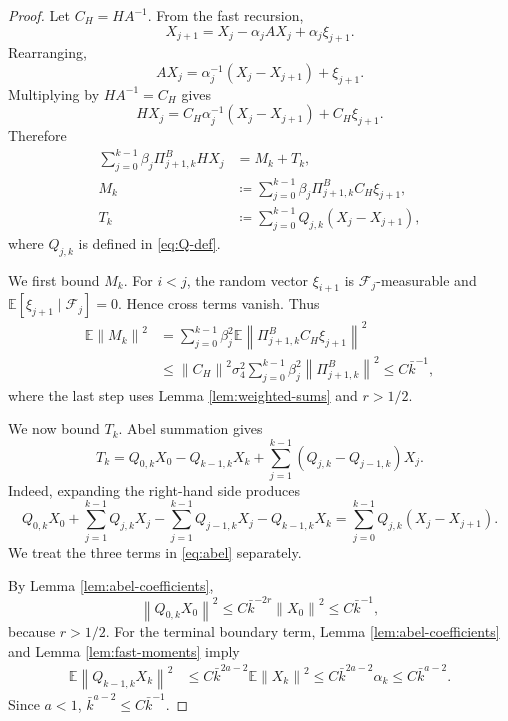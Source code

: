\documentclass{article}
\newcommand{\E}{\mathbb{E}}
\newcommand{\norm}[1]{\left\lVert #1\right\rVert}
\begin{document}
\begin{proof}
Let $C_H=HA^{-1}$. From the fast recursion,
\[
  X_{j+1}=X_j-\alpha_jAX_j+\alpha_j\xi_{j+1}.
\]
Rearranging,
\begin{equation}
  AX_j=\alpha_j^{-1}(X_j-X_{j+1})+\xi_{j+1}. \label{eq:poisson-identity}
\end{equation}
Multiplying by $HA^{-1}=C_H$ gives
\begin{equation}
  HX_j=C_H\alpha_j^{-1}(X_j-X_{j+1})+C_H\xi_{j+1}. \label{eq:H-identity}
\end{equation}
Therefore
\begin{align}
  \sum_{j=0}^{k-1}\beta_j\Pi^B_{j+1,k}HX_j
  &=M_k+T_k, \label{eq:S-M-T}\\
  M_k&\coloneqq\sum_{j=0}^{k-1}\beta_j\Pi^B_{j+1,k}C_H\xi_{j+1}, \label{eq:M-def}\\
  T_k&\coloneqq\sum_{j=0}^{k-1}Q_{j,k}(X_j-X_{j+1}), \label{eq:T-def}
\end{align}
where $Q_{j,k}$ is defined in \eqref{eq:Q-def}.

We first bound $M_k$. For $i<j$, the random vector $\xi_{i+1}$ is $\mathcal F_j$-measurable and $\E[\xi_{j+1}\mid\mathcal F_j]=0$. Hence cross terms vanish. Thus
\[
\begin{aligned}
  \E\norm{M_k}^2
  &=\sum_{j=0}^{k-1}\beta_j^2\E\norm{\Pi^B_{j+1,k}C_H\xi_{j+1}}^2\\
  &\le \norm{C_H}^2\sigma_4^2\sum_{j=0}^{k-1}\beta_j^2\norm{\Pi^B_{j+1,k}}^2
  \le C\bar k^{-1},
\end{aligned}
\]
where the last step uses Lemma \ref{lem:weighted-sums} and $r>1/2$.

We now bound $T_k$. Abel summation gives
\begin{equation}
  T_k=Q_{0,k}X_0-Q_{k-1,k}X_k+
      \sum_{j=1}^{k-1}(Q_{j,k}-Q_{j-1,k})X_j. \label{eq:abel}
\end{equation}
Indeed, expanding the right-hand side produces
\[
  Q_{0,k}X_0+
  \sum_{j=1}^{k-1}Q_{j,k}X_j-
  \sum_{j=1}^{k-1}Q_{j-1,k}X_j-Q_{k-1,k}X_k
  =\sum_{j=0}^{k-1}Q_{j,k}(X_j-X_{j+1}).
\]
We treat the three terms in \eqref{eq:abel} separately.

By Lemma \ref{lem:abel-coefficients},
\[
  \norm{Q_{0,k}X_0}^2\le C\bar k^{-2r}\norm{X_0}^2\le C\bar k^{-1},
\]
because $r>1/2$. For the terminal boundary term, Lemma \ref{lem:abel-coefficients} and Lemma \ref{lem:fast-moments} imply
\[
\begin{aligned}
  \E\norm{Q_{k-1,k}X_k}^2
  &\le C\bar k^{2a-2}\E\norm{X_k}^2
   \le C\bar k^{2a-2}\alpha_k
   \le C\bar k^{a-2}.
\end{aligned}
\]
Since $a<1$, $\bar k^{a-2}\le C\bar k^{-1}$.


\end{proof}
\end{document}
